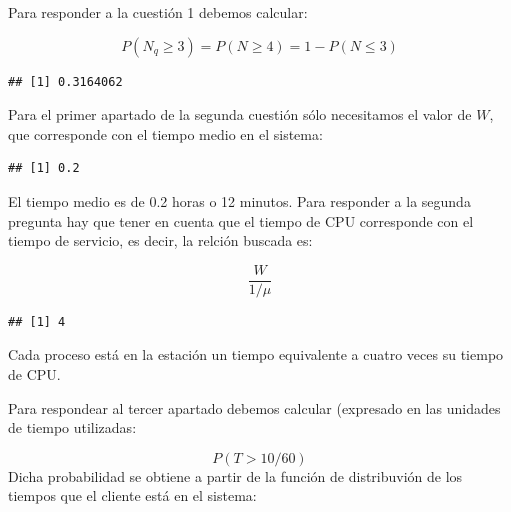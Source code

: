 \documentclass[
]{book}
\newenvironment{Shaded}{\begin{snugshade}}{\end{snugshade}}
\newcommand{\DecValTok}[1]{\textcolor[rgb]{0.00,0.00,0.81}{#1}}
\newcommand{\FunctionTok}[1]{\textcolor[rgb]{0.00,0.00,0.00}{#1}}
\newcommand{\NormalTok}[1]{#1}
\newcommand{\SpecialCharTok}[1]{\textcolor[rgb]{0.00,0.00,0.00}{#1}}
\theoremstyle{definition}
\theoremstyle{definition}
\theoremstyle{definition}
\theoremstyle{definition}
\theoremstyle{remark}
\begin{document}
Para responder a la cuestión 1 debemos calcular:

\[P(N_q \geq 3) = P(N \geq 4) = 1 - P(N \leq 3)\]

\begin{Shaded}
\end{Shaded}

\begin{verbatim}
## [1] 0.3164062
\end{verbatim}

Para el primer apartado de la segunda cuestión sólo necesitamos el valor de \(W\), que corresponde con el tiempo medio en el sistema:

\begin{Shaded}
\end{Shaded}

\begin{verbatim}
## [1] 0.2
\end{verbatim}

El tiempo medio es de 0.2 horas o 12 minutos. Para responder a la segunda pregunta hay que tener en cuenta que el tiempo de CPU corresponde con el tiempo de servicio, es decir, la relción buscada es:

\[\frac{W}{1/\mu}\]

\begin{Shaded}
\end{Shaded}

\begin{verbatim}
## [1] 4
\end{verbatim}

Cada proceso está en la estación un tiempo equivalente a cuatro veces su tiempo de CPU.

Para respondear al tercer apartado debemos calcular (expresado en las unidades de tiempo utilizadas:

\[P(T > 10/60)\]
Dicha probabilidad se obtiene a partir de la función de distribuvión de los tiempos que el cliente está en el sistema:
\end{document}
